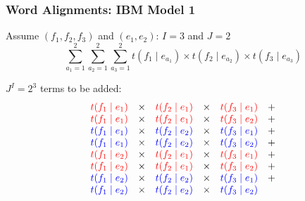 \begin{frame}
\frametitle{Word Alignments: IBM Model 1}
\begin{block}{Assume $(f_1, f_2, f_3)$ and $(e_1, e_2)$: $I=3$ and $J=2$}
\[ \sum_{a_1=1}^2 \sum_{a_2=1}^2 \sum_{a_3=1}^2 t(f_1 \mid e_{a_1}) \times t(f_2 \mid e_{a_2}) \times t(f_3 \mid e_{a_3}) \]
\end{block}
\begin{block}{$J^I = 2^3$ terms to be added:}
\[ 
\begin{array}{cccccc}
\color{red} t(f_1 \mid e_1) & \times & \color{red} t(f_2 \mid e_1) & \times & \color{red} t(f_3 \mid e_1) & + \\
\color{red} t(f_1 \mid e_1) & \times & \color{red} t(f_2 \mid e_1) & \times & \color{red} t(f_3 \mid e_2) & + \\
\color{blue} t(f_1 \mid e_1) & \times & \color{blue} t(f_2 \mid e_2) & \times & \color{blue} t(f_3 \mid e_1) & + \\
\color{blue} t(f_1 \mid e_1) & \times & \color{blue} t(f_2 \mid e_2) & \times & \color{blue} t(f_3 \mid e_2) & + \\
\color{red} t(f_1 \mid e_2) & \times & \color{red} t(f_2 \mid e_1) & \times & \color{red} t(f_3 \mid e_1) & + \\
\color{red} t(f_1 \mid e_2) & \times & \color{red} t(f_2 \mid e_1) & \times & \color{red} t(f_3 \mid e_2) & + \\
\color{blue} t(f_1 \mid e_2) & \times & \color{blue} t(f_2 \mid e_2) & \times & \color{blue} t(f_3 \mid e_1) & + \\
\color{blue} t(f_1 \mid e_2) & \times & \color{blue} t(f_2 \mid e_2) & \times & \color{blue} t(f_3 \mid e_2) & \\
\end{array}
\]
\end{block}
\end{frame}

